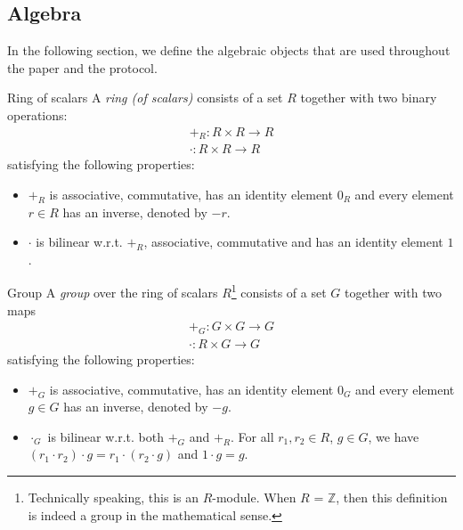 
\subsection{Algebra}

In the following section, we define the algebraic objects that are used throughout the paper and the \MantaPay{} protocol. 

\begin{definitiontoc}{Ring of scalars}
    A \emph{ring (of scalars)} consists of a set $R$ together with two binary operations:
    \begin{align*}
        +_R \colon R \times R \longrightarrow R \\
        \cdot \colon R \times R \longrightarrow R
    \end{align*}
    satisfying the following properties:
    \begin{itemize}
        \item $+_R$ is associative, commutative, has an identity element $0_R$ and every element $r \in R$ has an inverse, denoted by $-r$. 
        \item $\cdot$ is bilinear w.r.t. $+_R$, associative, commutative and has an identity element $1$.
    \end{itemize}
\end{definitiontoc}

\begin{definitiontoc}{Group}\label{defn:group}
    A \emph{group} over the ring of scalars $R$\footnote{Technically speaking, this is an $R$-module. When $R$ = $\mathbb{Z}$, then this definition is indeed a group in the mathematical sense.} consists of a set $G$ together with two maps
    \begin{align*}
        +_G \colon G \times G \longrightarrow G \\
        \cdot \colon R \times G \longrightarrow G
    \end{align*}
    satisfying the following properties:
    \begin{itemize}
        \item $+_G$ is associative, commutative, has an identity element $0_G$ and every element $g \in G$ has an inverse, denoted by $-g$. 
        \item $\cdot_G$ is bilinear w.r.t. both $+_G$ and $+_R$. For all $r_1, r_2 \in R$, $g \in G$, we have $(r_1 \cdot r_2) \cdot g = r_1 \cdot (r_2 \cdot g)$ and $1 \cdot g = g$.
    \end{itemize}
\end{definitiontoc}


